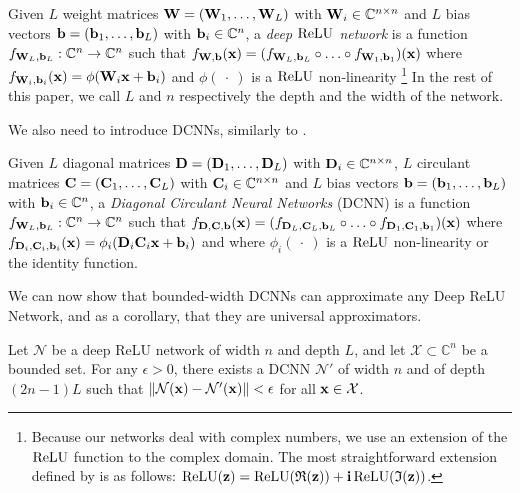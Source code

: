 \begin{definition} \label{definition:deep_relu_network}
Given $L$ weight matrices $\mathbf{W} = (\mathbf{W}_1, \ldots, \mathbf{W}_L)$ with $\mathbf{W}_i \in {\ensuremath \mathbb{C}}^{n \times n}$ and  $L$ bias vectors $\mathbf{b} = (\mathbf{b}_1, \ldots, \mathbf{b}_L)$  with  $\mathbf{b}_i \in {\ensuremath \mathbb{C}}^{n}$, a \emph{deep $\operatorname{ReLU}$ network} is a function $f_{\mathbf{W}_L, \mathbf{b}_L} : {\mathbb{C}}^{n} \rightarrow {\ensuremath \mathbb{C}}^{n}$ such that $f_{\mathbf{W}, \mathbf{b}}(\mathbf{x}) =  (f_{\mathbf{W}_L, \mathbf{b}_L} \circ \ldots \circ f_{\mathbf{W}_1, \mathbf{b}_1})(\mathbf{x})$ where $f_{\mathbf{W}_i, \mathbf{b}_i}(\mathbf{x}) = \phi(\mathbf{W}_i \mathbf{x} + \mathbf{b}_i)$ and $\phi(\ \cdot\ )$ is a $\operatorname{ReLU}$ non-linearity \footnote{Because our networks deal with complex numbers, we use an extension of the $\operatorname{ReLU}$ function to the complex domain. The most straightforward extension defined by \citet{DBLP:conf/iclr/TrabelsiBZSSSMR18} is as follows: $\mathrm{\relu}(\zvec) = \relu\left(\mathfrak{R}(\zvec)\right) + \ci \relu \left(\mathfrak{I}(\zvec)\right)$.}
In the rest of this paper, we call $L$ and $n$ respectively the depth and the width of the network.
\end{definition}

We also need to introduce DCNNs, similarly to \citet{moczulski2015acdc}.

\begin{definition} \label{definition:DCNN}
Given $L$ diagonal matrices $\mathbf{D} = (\mathbf{D}_1, \ldots, \mathbf{D}_L)$ with $\mathbf{D}_i \in {\ensuremath \mathbb{C}}^{n \times n}$, $L$ circulant matrices $\mathbf{C} = (\mathbf{C}_1, \ldots, \mathbf{C}_L)$ with $\mathbf{C}_i \in {\ensuremath \mathbb{C}}^{n \times n}$ and $L$ bias vectors $\mathbf{b} = (\mathbf{b}_1, \ldots, \mathbf{b}_L)$ with  $\mathbf{b}_i \in {\ensuremath \mathbb{C}}^{n}$, a \emph{Diagonal Circulant Neural Networks} (DCNN) is a function $f_{\mathbf{W}_L, \mathbf{b}_L} : {\mathbb{C}}^{n} \rightarrow {\ensuremath \mathbb{C}}^{n}$ such that $f_{\mathbf{D},\mathbf{C},\mathbf{b}}(\mathbf{x}) = (f_{\mathbf{D}_L, \mathbf{C}_L, \mathbf{b}_L} \circ \ldots \circ f_{\mathbf{D}_1, \mathbf{C}_1, \mathbf{b}_1})(\mathbf{x})$ where $f_{\mathbf{D}_i, \mathbf{C}_i, \mathbf{b}_i}(\mathbf{x}) = \phi_i (\mathbf{D}_i \mathbf{C}_i \mathbf{x} + \mathbf{b}_i)$ and where $\phi_i(\ \cdot\ )$ is a $\operatorname{ReLU}$ non-linearity or the identity function.
\end{definition}

We can now show that bounded-width DCNNs can approximate any Deep ReLU Network, and as a corollary, that they are universal approximators.

\begin{lemma} \label{lemma:dcnn_approx_neural_network}
Let $\mathcal{N}$ be a deep ReLU network of width $n$ and depth $L$, and let $\mathcal{X} \subset \mathbb{C}^{n}$ be a bounded set.
For any $\epsilon > 0$, there exists a DCNN $\mathcal{N}'$ of width $n$ and of depth $(2n-1)L$ such that $\norm{\mathcal{N}(\mathbf{x}) - \mathcal{N}'(\mathbf{x})} < \epsilon$ for all $\mathbf{x} \in \mathcal{X}$.
\end{lemma}

